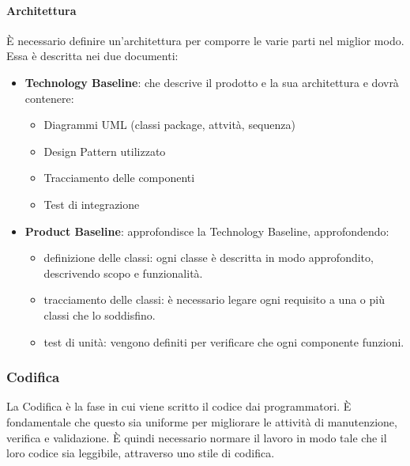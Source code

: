 \paragraph{Architettura}
È necessario definire un'architettura per comporre le varie parti nel miglior modo. Essa è descritta nei due documenti:
\begin{itemize}
  \item \textbf{Technology Baseline}: che descrive il prodotto e la sua architettura e dovrà contenere:
  \begin{itemize}
    \item Diagrammi UML (classi package, attvità, sequenza)
    \item Design Pattern utilizzato
    \item Tracciamento delle componenti
    \item Test di integrazione
  \end{itemize}
  \item \textbf{Product Baseline}: approfondisce la Technology Baseline, approfondendo:
  \begin{itemize}
    \item definizione delle classi: ogni classe è descritta in modo approfondito, descrivendo scopo e funzionalità.
    \item tracciamento delle classi: è necessario legare ogni requisito a una o più classi che lo soddisfino.
    \item test di unità: vengono definiti per verificare che ogni componente funzioni.
  \end{itemize}
\end{itemize}
\subsubsection{Codifica}
La Codifica è la fase in cui viene scritto il codice dai programmatori. È fondamentale che questo sia uniforme per migliorare le attività di manutenzione, verifica e validazione. È quindi necessario normare il lavoro in modo tale che il loro codice sia leggibile, attraverso uno stile di codifica.
